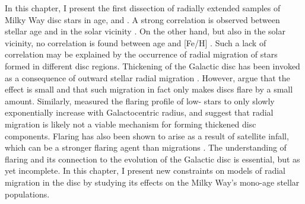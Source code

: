 
 In this chapter, I present the first dissection of radially extended samples of Milky Way disc stars in age, \feh{} and \afe{}. A strong correlation is observed between stellar age and \afe{} in the solar vicinity \citep{2013A&A...560A.109H}. On the other hand, but also in the solar vicinity, no correlation is found between age and [Fe/H] \citep[e.g.][]{1993A&A...275..101E,2004A&A...418..989N}. Such a lack of correlation may be explained by the occurrence of radial migration of stars formed in different disc regions. Thickening of the Galactic disc has been invoked as a consequence of outward stellar radial migration \citep[e.g.][]{2009MNRAS.399.1145S}. However, \citet{2012A&A...548A.127M} argue that the effect is small and that such migration in fact only makes discs flare by a small amount. Similarly, \citet{2016ApJ...823...30B} measured the flaring profile of low-\afe{} stars to only slowly exponentially increase with Galactocentric radius, and suggest that radial migration is likely not a viable mechanism for forming thickened disc components. Flaring has also been shown to arise as a result of satellite infall, which can be a stronger flaring agent than migrations \citep[e.g.][]{2009ApJ...707L...1B}. The understanding of flaring and its connection to the evolution of the Galactic disc is essential, but as yet incomplete. In this chapter, I present new constraints on models of radial migration in the disc by studying its effects on the Milky Way's mono-age stellar populations. 

